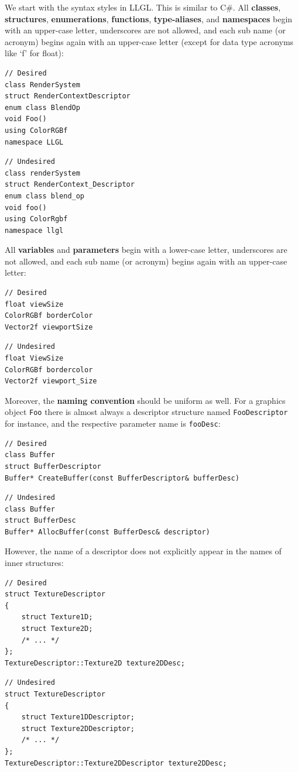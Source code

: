 \documentclass{article}
\begin{document}
We start with the syntax styles in LLGL. This is similar to C\#.
All \textbf{classes}, \textbf{structures}, \textbf{enumerations}, \textbf{functions}, \textbf{type-aliases},
and \textbf{namespaces} begin with an upper-case letter, underscores are not allowed,
and each sub name (or acronym) begins again with an upper-case letter (except for data type acronyms like `f' for float):
\begin{lstlisting}
// Desired
class RenderSystem
struct RenderContextDescriptor
enum class BlendOp
void Foo()
using ColorRGBf
namespace LLGL
\end{lstlisting}
\begin{lstlisting}
// Undesired
class renderSystem
struct RenderContext_Descriptor
enum class blend_op
void foo()
using ColorRgbf
namespace llgl
\end{lstlisting}
All \textbf{variables} and \textbf{parameters} begin with a lower-case letter, underscores are not allowed,
and each sub name (or acronym) begins again with an upper-case letter:
\begin{lstlisting}
// Desired
float viewSize
ColorRGBf borderColor
Vector2f viewportSize
\end{lstlisting}
\begin{lstlisting}
// Undesired
float ViewSize
ColorRGBf bordercolor
Vector2f viewport_Size
\end{lstlisting}
Moreover, the \textbf{naming convention} should be uniform as well. For a graphics object \texttt{Foo}
there is almost always a descriptor structure named \texttt{FooDescriptor} for instance,
and the respective parameter name is \texttt{fooDesc}:
\begin{lstlisting}
// Desired
class Buffer
struct BufferDescriptor
Buffer* CreateBuffer(const BufferDescriptor& bufferDesc)
\end{lstlisting}
\begin{lstlisting}
// Undesired
class Buffer
struct BufferDesc
Buffer* AllocBuffer(const BufferDesc& descriptor)
\end{lstlisting}
However, the name of a descriptor does not explicitly appear in the names of inner structures:
\begin{lstlisting}
// Desired
struct TextureDescriptor
{
	struct Texture1D;
	struct Texture2D;
	/* ... */
};
TextureDescriptor::Texture2D texture2DDesc;
\end{lstlisting}
\begin{lstlisting}
// Undesired
struct TextureDescriptor
{
	struct Texture1DDescriptor;
	struct Texture2DDescriptor;
	/* ... */
};
TextureDescriptor::Texture2DDescriptor texture2DDesc;
\end{lstlisting}
\end{document}
